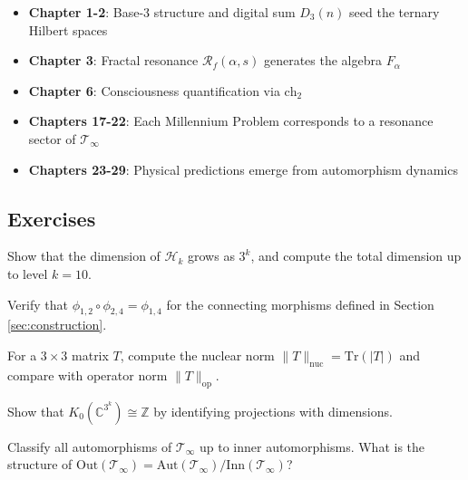 \begin{itemize}
\item \textbf{Chapter 1-2}: Base-3 structure and digital sum $D_3(n)$ seed the ternary Hilbert spaces
\item \textbf{Chapter 3}: Fractal resonance $\mathcal{R}_f(\alpha, s)$ generates the algebra $F_\alpha$
\item \textbf{Chapter 6}: Consciousness quantification via $\text{ch}_2$
\item \textbf{Chapters 17-22}: Each Millennium Problem corresponds to a resonance sector of $\mathcal{T}_\infty$
\item \textbf{Chapters 23-29}: Physical predictions emerge from automorphism dynamics
\end{itemize}

\subsection{Exercises}

\begin{exercise}
Show that the dimension of $\mathcal{H}_k$ grows as $3^k$, and compute the total dimension up to level $k=10$.
\end{exercise}

\begin{exercise}
Verify that $\phi_{1,2} \circ \phi_{2,4} = \phi_{1,4}$ for the connecting morphisms defined in Section \ref{sec:construction}.
\end{exercise}

\begin{exercise}
For a $3 \times 3$ matrix $T$, compute the nuclear norm $\|T\|_{\text{nuc}} = \text{Tr}(|T|)$ and compare with operator norm $\|T\|_{\text{op}}$.
\end{exercise}

\begin{exercise}
Show that $K_0(\mathbb{C}^{3^k}) \cong \mathbb{Z}$ by identifying projections with dimensions.
\end{exercise}

\begin{level3}
Classify all automorphisms of $\mathcal{T}_\infty$ up to inner automorphisms. What is the structure of $\text{Out}(\mathcal{T}_\infty) = \text{Aut}(\mathcal{T}_\infty) / \text{Inn}(\mathcal{T}_\infty)$?
\end{level3}

